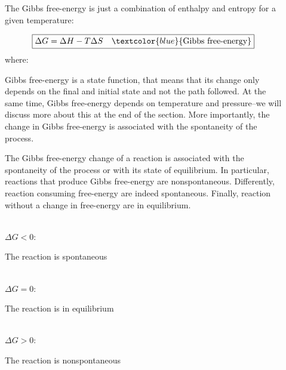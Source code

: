 \documentclass[main.tex]{subfiles}
\newcommand\chapterlabel{entropy}
\begin{document}
\begin{description}
\item[] The Gibbs free-energy is just a combination of enthalpy and entropy for a given temperature:

\begin{equation}\begin{split}
\boxed{  \Delta G  =  \Delta H -T \Delta S \quad \textcolor{blue}{\text{Gibbs free-energy}}  }
\label{\chapterlabel:equation6}
\end{split}\end{equation}
where:
Gibbs free-energy is a state function, that means that its change only depends on the final and initial state and not the path followed. At the same time, Gibbs free-energy depends on temperature and pressure--we will discuss more about this at the end of the section. More importantly, the change in Gibbs free-energy is associated with the spontaneity of the process.
\item[] The Gibbs free-energy change of a reaction is associated with the spontaneity of the process or with its state of equilibrium. In particular, reactions that produce Gibbs free-energy are nonspontaneous. Differently, reaction consuming free-energy are indeed spontaneous. Finally, reaction without a change in free-energy are in equilibrium.
\\  \faCodeFork\ \begin{bf}$\Delta G<0$:\end{bf} The reaction is spontaneous
  \\ \faCodeFork\ \begin{bf}$\Delta G=0$:\end{bf} The reaction is in equilibrium
    \\ \faCodeFork\ \begin{bf}$\Delta G>0$:\end{bf} The reaction is nonspontaneous
\item[]

\end{description}
\end{document}
